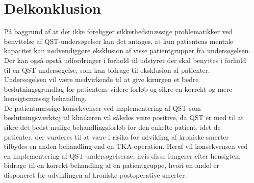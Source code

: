 \section{Delkonklusion}
På baggrund af at der ikke foreligger sikkerhedsmæssige problematikker ved benyttelse af QST-undersøgelser kan det antages, at kun patientens mentale kapacitet kan nødvendiggøre eksklusion af visse patientgrupper fra undersøgelsen. Der kan også opstå udfordringer i forhold til udstyret der skal benyttes i forhold til en QST-undersøgelse, som kan bidrage til eksklusion af patienter. Undersøgelsen vil være medvirkende til at give kirurgen et bedre beslutningsgrundlag for patientens videre forløb og sikre en korrekt og mere hensigtsmæssig behandling. \\
De patientmæssige konsekvenser ved implementering af QST som beslutningsværktøj til klinikeren vil således være positive, da QST er med til at sikre det bedst mulige behandlingsforløb for den enkelte patient, idet de patienter, der vurderes til at være i risiko for udvikling af kroniske smerter tilbydes en anden behandling end en TKA-operation. Heraf vil konsekvensen ved en implementering af QST-undersøgelserne, hvis disse fungerer efter hensigten, bidrage til en korrekt behandling af en patientgruppe, hvori en andel er disponeret for udviklingen af kroniske postoperative smerter.


